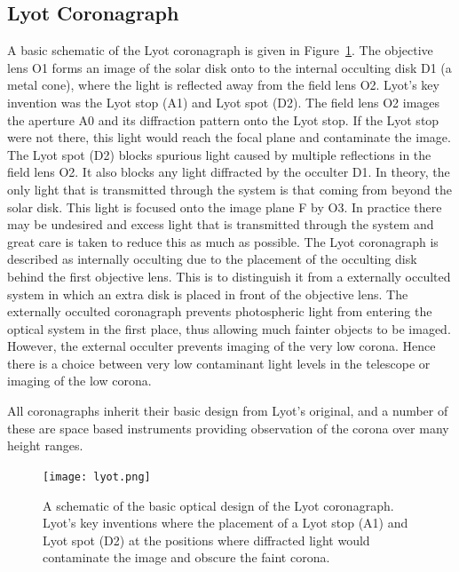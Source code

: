 \subsection{Lyot Coronagraph}\label{sec:22}
A basic schematic of the Lyot coronagraph is given in Figure~\ref{fig:lyot}. The objective lens O1 forms an image of the solar disk onto
to the internal occulting disk D1 (a metal cone), where the light is reflected away from the field lens O2. Lyot's key invention was the Lyot stop (A1) and Lyot spot (D2). The field lens O2 images the aperture A0 and its diffraction pattern onto the Lyot stop. If the Lyot stop were not there, this light would reach the focal plane and contaminate the image. The Lyot spot (D2) blocks spurious light caused by multiple reflections in the field lens O2. It also blocks any light diffracted by the occulter D1. In theory, the only light that is transmitted through the system is that coming from beyond the solar disk. This light is focused onto the image plane F by O3. In practice there may be undesired and excess light that is transmitted through the system and great care is taken to reduce this as much as possible. The Lyot coronagraph is described as internally occulting due to the placement of the occulting disk behind the first objective lens. This is to distinguish it from a externally occulted system in which an extra disk is placed in front of the objective lens. The externally occulted coronagraph prevents photospheric light from entering the optical system in the first place, thus allowing much fainter objects to be imaged. However, the external occulter prevents imaging of the very low corona. Hence there is a choice between very low contaminant light levels in the telescope or imaging of the low corona. 

All coronagraphs inherit their basic design from Lyot's original, and a number of these are space based instruments providing observation of the corona over many height ranges.

\begin{figure}[!t]
\begin{center}
\texttt{[image: lyot.png]}
\caption[The Lyot coronagraph]{A schematic of the basic optical design of the Lyot coronagraph. Lyot's key inventions where the placement of a Lyot stop (A1) and Lyot spot (D2) at the positions where diffracted light would contaminate the image and obscure the faint corona.}
\label{fig:lyot}
\end{center}
\end{figure}

